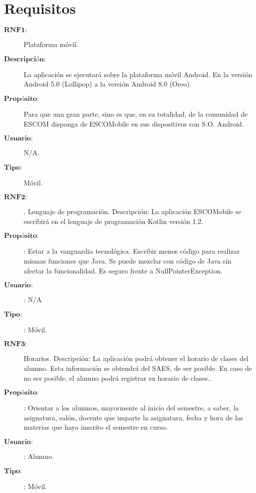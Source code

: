 \section{Requisitos}

\begin{description}
\item[$\textbf{RNF1:}$] Plataforma móvil.
\item[$\textbf{Descripción:}$] La aplicación se ejecutará sobre la plataforma móvil Android. En la versión
 Android 5.0 (Lollipop) a la versión Android 8.0 (Oreo).
\item[$\textbf{Propósito:}$] Para que una gran parte, sino es que, en su totalidad, de la comunidad de
 ESCOM disponga de ESCOMobile en sus dispositivos con S.O. Android.
\item[$\textbf{Usuario:}$] N/A.
\item[$\textbf{Tipo:}$] Móvil.	\\

\item[$\textbf{RNF2:}$]. Lenguaje de programación.
Descripción:  La aplicación ESCOMobile se escribirá en el lenguaje de programación Kotlin versión 1.2.
\item[$\textbf{Propósito:}$]:
Estar a la vanguardia tecnológica.
Escribir menos código para realizar mismas funciones que Java.
Se puede mezclar con código de Java sin afectar la funcionalidad.
Es seguro frente a NullPointerException.
\item[$\textbf{Usuario:}$]: N/A
\item[$\textbf{Tipo:}$]: Móvil.\\

\item[$\textbf{RNF3:}$] Horarios.
Descripción: La aplicación podrá obtener el horario de clases del alumno. Esta información se obtendrá del SAES, de ser posible. En caso de no ser posible, el alumno podrá registrar su horario de clases..
\item[$\textbf{Propósito:}$]: Orientar a los alumnos, mayormente al inicio del semestre, a saber, la asignatura, salón, docente que imparte la asignatura, fecha y hora de las materias que haya inscrito el semestre en curso.
\item[$\textbf{Usuario:}$]: Alumno.
\item[$\textbf{Tipo:}$]: Móvil. \\


\end{description}
